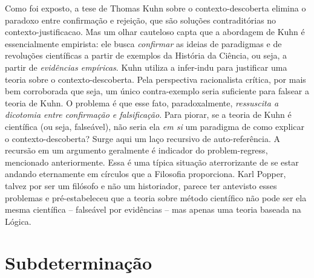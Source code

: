 \documentclass[./main.tex]{subfiles}
\begin{document}
\par Como foi exposto, a tese de Thomas Kuhn sobre o \gls{contexto-descoberta} elimina o paradoxo entre confirmação e rejeição, que são soluções contraditórias no \gls{contexto-justificacao}. Mas um olhar cauteloso capta que a abordagem de Kuhn é essencialmente empirista: ele busca \textit{confirmar} as ideias de paradigmas e de revoluções científicas a partir de exemplos da História da Ciência, ou seja, a partir de \textit{evidências empíricas}. Kuhn utiliza a \gls{infer-indu} para justificar uma \gls{teoria} sobre o \gls{contexto-descoberta}. Pela perspectiva racionalista crítica, por mais bem corroborada que seja, um único contra-exemplo seria suficiente para falsear a \gls{teoria} de Kuhn. O problema é que esse fato, paradoxalmente, \textit{ressuscita a dicotomia entre confirmação e falsificação}. Para piorar, se a \gls{teoria} de Kuhn é científica (ou seja, falseável), não seria ela \textit{em si} um \gls{paradigma} de como explicar o \gls{contexto-descoberta}? Surge aqui um laço recursivo de auto-referência. A recursão em um argumento geralmente é indicador do \gls{problem-regress}, mencionado anteriormente. Essa é uma típica situação aterrorizante de se estar andando eternamente em círculos que a Filosofia proporciona. Karl Popper, talvez por ser um filósofo e não um historiador, parece ter antevisto esses problemas e pré-estabeleceu que a \gls{teoria} sobre método científico não pode ser ela mesma científica -- falseável por evidências -- mas apenas uma \gls{teoria} baseada na Lógica.

\section{Subdeterminação} \label{sec:epis:under}
\end{document}
